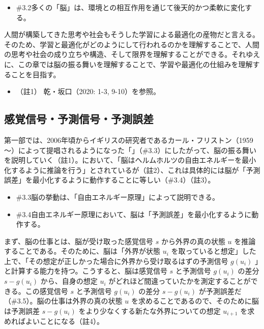 \begin{note}{}
  \begin{itemize}
    \tightlist
    \item{\#3.2}多くの「脳」は、環境との相互作用を通じて後天的かつ柔軟に変化する。
  \end{itemize}
\end{note}

人間が構築してきた思考や社会もそうした学習による最適化の産物だと言える。そのため、学習と最適化がどのようにして行われるのかを理解することで、人間の思考や社会の成り立ちや構造、そして限界を理解することができる。それゆえに、この章では脳の振る舞いを理解することで、学習や最適化の仕組みを理解することを目指す。

\begin{itemize}
\tightlist
\item
  （註1） 乾・坂口（2020: 1-3, 9-10）\cite{InuiAndSakaguchi}を参照。
\end{itemize}

\subsection{感覚信号・予測信号・予測誤差}\label{ux611fux899aux4fe1ux53f7ux4e88ux6e2cux4fe1ux53f7ux4e88ux6e2cux8aa4ux5dee}

第一部では、2006年頃からイギリスの研究者であるカール・フリストン（1959～）によって提唱されるようになった「」（\#3.3）にしたがって、脳の振る舞いを説明していく（註1）。において、「脳はヘルムホルツの自由エネルギーを最小化するように推論を行う」とされているが（註2）、これは具体的には脳が「予測誤差」を最小化するように動作することに等しい（\#3.4）（註3）。

\begin{note}{}
  \begin{itemize}
    \tightlist
    \item{\#3.3}脳の挙動は、「自由エネルギー原理」によって説明できる。
    \item{\#3.4}自由エネルギー原理において、脳は「予測誤差」を最小化するように動作する。
  \end{itemize}
\end{note}

まず、脳の仕事とは、脳が受け取った感覚信号 \(s\) から外界の真の状態
\(u\) を推論することである。そのために、脳は「外界が状態 \(u_i\)
を取っていると想定」した上で、「その想定が正しかった場合に外界から受け取るはずの予測信号
\(g(u_i)\) 」と計算する能力を持つ。こうすると、脳は感覚信号 \(s\)
と予測信号 \(g(u_i)\) の差分 \(s-g(u_i)\) から、自身の想定 \(u_i\)
がどれほど間違っていたかを測定することができる。この感覚信号 \(s\)
と予測信号 \(g(u_i)\) の差分 \(s-g(u_i)\)
が予測誤差だ（\#3.5）。脳の仕事は外界の真の状態 \(u\)
を求めることであるので、そのために脳は予測誤差 \(s-g(u_i)\)
をより少なくする新たな外界についての想定 \(u_{i+1}\)
を求めればよいことになる（註4）。

